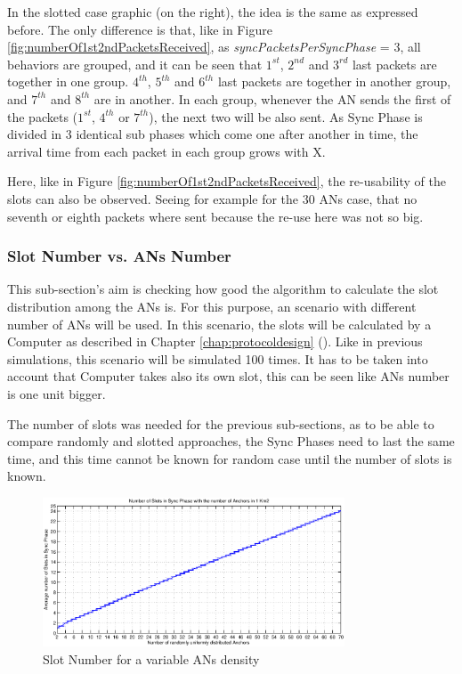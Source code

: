 In the slotted case graphic (on the right), the idea is the same as expressed before. The only difference is that, like in Figure 
\ref{fig:numberOf1st2ndPacketsReceived}, as \textit{syncPacketsPerSyncPhase} = 3, all behaviors are grouped, and it can be seen that $1^{st}$, 
$2^{nd}$ and $3^{rd}$ last packets are together in one group. $4^{th}$, $5^{th}$ and $6^{th}$ last packets are together in another group, and 
$7^{th}$ and $8^{th}$ are in another. In each group, whenever the \ac{AN} sends the first of the packets ($1^{st}$, $4^{th}$ or $7^{th}$), the 
next two will be also sent. As Sync Phase is divided in 3 identical sub phases which come one after another in time, the arrival time from 
each packet in each group grows with X.

Here, like in Figure \ref{fig:numberOf1st2ndPacketsReceived}, the re-usability of the slots can also be observed. Seeing for example for the 
30 \acp{AN} case, that no seventh or eighth packets where sent because the re-use here was not so big.

\subsubsection{Slot Number vs. \acp{AN} Number}

This sub-section's aim is checking how good the algorithm to calculate the slot distribution among the \acp{AN} is. For this purpose, an scenario 
with different number of \acp{AN} will be used. In this scenario, the slots will be calculated by a Computer as described in Chapter 
\ref{chap:protocoldesign} (). Like in previous simulations, this scenario will be simulated 100 times. It has to
be taken into account that Computer takes also its own slot, this can be seen like \acp{AN} number is one unit bigger.

The number of slots was needed for the previous sub-sections, as to be able to compare randomly and slotted approaches, the Sync Phases need 
to last the same time, and this time cannot be known for random case until the number of slots is known.

\begin{figure}[ht]
 \begin{center}
  \includegraphics[width=0.8\textwidth]{numberOfSlotsWithTheAnchorDensity.eps}
 \end{center}
 \caption{Slot Number for a variable \acp{AN} density}
 \label{fig:numberOfSlotsWithTheAnchorDensity}
\end{figure}


